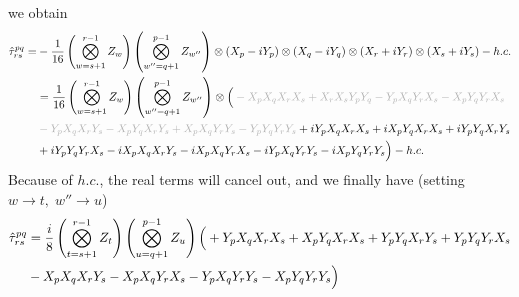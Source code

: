 \documentclass[prb,amsmath,amsfonts,amssymb]{revtex4}
\newcommand{\black}{\color{black}{}}
\newcommand{\grey}{\color{grey}{}}
\begin{document}
we obtain
\begin{align}
	\hat \tau_{rs}^{pq} =  & -\frac{1}{16} \left(\bigotimes_{w=s+1}^{r-1} Z_w \right) \left(\bigotimes_{w''=q+1}^{p-1} Z_{w''} \right) \otimes
 \left(X_p - i Y_p\right) 
	\otimes 
	 \left(X_q - i Y_q\right) 	\otimes
	\left(X_r + i Y_r\right)
	\otimes
\left(X_s + i Y_s\right)
- h.c.\nonumber\\
&= \frac{1}{16} \left(\bigotimes_{w=s+1}^{r-1} Z_w \right) \left(\bigotimes_{w''=q+1}^{p-1} Z_{w''} \right) \otimes
 \Bigl(
\grey -X_p X_q X_r X_s 
+ X_r X_s Y_p Y_q 
 - Y_p X_q Y_r X_s 
- X_p Y_q Y_r X_s\nonumber\\
&\grey- Y_p X_q X_r Y_s 
- X_p Y_q X_r Y_s 
+ X_p X_q Y_r Y_s 
- Y_p Y_q Y_r Y_s
\black + i Y_p X_q X_r X_s 
+ i X_p Y_q X_r X_s 
+ i Y_p Y_q X_r Y_s 
\nonumber\\
&+ i Y_p Y_q Y_r X_s 
- i X_p X_q X_r Y_s 
 - i X_p X_q Y_r X_s 
- i Y_p X_q Y_r Y_s 
- i X_p Y_q Y_r Y_s 
\black\Bigr) 
 - h.c.\label{eq:pqrs}
\end{align}
Because of $h.c.$, the real terms will cancel out, and we finally have (setting $w\rightarrow t, \; w'' \rightarrow u$)
\begin{align}
	\hat \tau_{rs}^{pq} &= \frac{i}{8} \left(\bigotimes_{t=s+1}^{r-1} Z_t \right) \left(\bigotimes_{u=q+1}^{p-1} Z_{u} \right) 
 \Bigl(
\black +Y_p X_q X_r X_s 
\black  + X_p Y_q X_r X_s
\black + Y_p Y_q X_r  Y_s 
\black+ Y_p Y_q Y_r  X_s \\&
\black - X_p X_q X_r Y_s 
\black - X_p X_q Y_r X_s 
\black -Y_p  X_q  Y_r Y_s 
\black- X_p Y_q Y_r Y_s 
\black\Bigr) 
\end{align}
\end{document}
